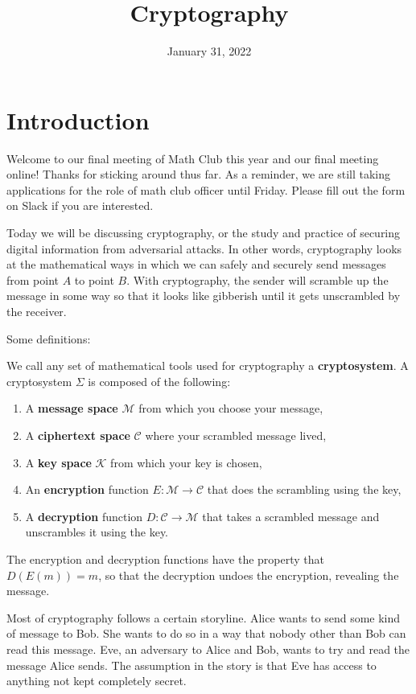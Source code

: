 \documentclass{article}
\title{Cryptography}
\author{}
\date{January 31, 2022}
\begin{document}
\section{Introduction}

    Welcome to our final meeting of Math Club this year and our final meeting online!
    Thanks for sticking around thus far.
    As a reminder, we are still taking applications for the role of math club officer until Friday.
    Please fill out the form on Slack if you are interested.

    Today we will be discussing cryptography, or the study and practice of securing digital information from adversarial attacks.
    In other words, cryptography looks at the mathematical ways in which we can safely and securely send messages from point \(A\) to point \(B\).
    With cryptography, the sender will scramble up the message in some way so that it looks like gibberish until it gets unscrambled by the receiver.

    Some definitions:
    \begin{definition}
        We call any set of mathematical tools used for cryptography a \textbf{cryptosystem}.
        A cryptosystem \(\Sigma\) is composed of the following:
        \begin{enumerate}
            \item A \textbf{message space} \(\mathcal{M}\) from which you choose your message,
            \item A \textbf{ciphertext space} \(\mathcal{C}\) where your scrambled message lived,
            \item A \textbf{key space} \(\mathcal{K}\) from which your key is chosen,
            \item An \textbf{encryption} function \(E:\mathcal{M}\to \mathcal{C}\) that does the scrambling using the key,
            \item A \textbf{decryption} function \(D:\mathcal{C}\to \mathcal{M}\) that takes a scrambled message and unscrambles it using the key.
        \end{enumerate}
        The encryption and decryption functions have the property that \(D(E(m))=m\), so that the decryption undoes the encryption, revealing the message.
    \end{definition}

    Most of cryptography follows a certain storyline.
    Alice wants to send some kind of message to Bob.
    She wants to do so in a way that nobody other than Bob can read this message.
    Eve, an adversary to Alice and Bob, wants to try and read the message Alice sends.
    The assumption in the story is that Eve has access to anything not kept completely secret.
\end{document}
